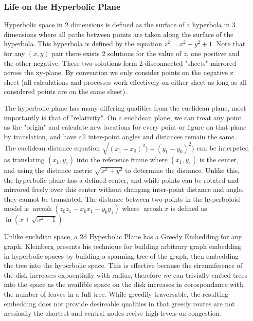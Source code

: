 \subsubsection{Life on the Hyperbolic Plane}
Hyperbolic space in 2 dimensions is defined as the surface of a hyperbola in 3 dimensions where all paths between points are taken along the surface of the hyperbola.
This hyperbola is defined by the equation $z^{2}=x^{2}+y^{2}+1$.
Note that for any $(x,y)$ pair there exists 2 solutions for the value of $z$, one positive and the other negative.
These two solutions form 2 disconnected "sheets" mirrored across the xy-plane.
By convention we only consider points on the negative z sheet (all calculations and processes work effectively on either sheet as long as all considered points are on the same sheet).

The hyperbolic plane has many differing qualities from the euclidean plane, most importantly is that of "relativity".
On a euclidean plane, we can treat any point as the "origin" and calculate new locations for every point or figure on that plane by translation, and have all inter-point angles and distances remain the same.
The euclidean distance equation $\sqrt{(x_{1}-x_{0})^{2})+(y_{1}-y_{0})^{2})}$ can be interpeted as translating $(x_{1},y_{1})$ into the reference frame where $(x_{1},y_{1})$ is the center, and using the distance metric $\sqrt{x^{2}+y^{2}}$ to determine the distance.
Unlike this, the hyperbolic plane has a defined center, and while points can be rotated and mirrored freely over this center without changing inter-point distance and angle, they cannot be translated.
The distance between two points in the hyperboloid model is $\operatorname{arcosh}(z_{0}z_{1} - x_{0}x_{1} - y_{0}y_{1})$ where $\operatorname{arcosh}x$ is defined as $\ln{(x+\sqrt{x^{2}+1})}$

Unlike euclidian space, a 2d Hyperbolic Plane has a Greedy Embedding for any graph.
Kleinberg presents his technique for building arbitrary graph embedding in hyperbolic spaces by building a spanning tree of the graph, then embedding the tree into the hyperbolic space.
This is effective because the circumference of the disk increases expoentially with radius, therefore we can trivially embed trees into the space as the availible space on the disk increases in corospondance with the number of leaves in a full tree.
While greedily traversable, the resulting embedding does not provide desireable qualities in that greedy routes are not nessiasily the shortest and central nodes recive high levels on congestion.



